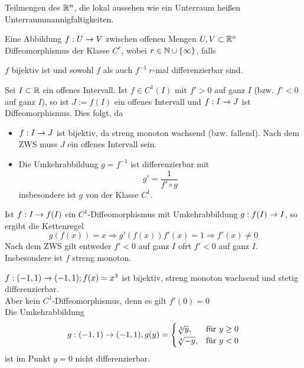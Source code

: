 \documentclass[../ana2u.tex]{subfiles}
\begin{document}
Teilmengen des \( \mathbb{R}^n \), die lokal aussehen wie ein Unterraum 
heißen Unterraummannigfaltigkeiten.
\begin{defi*}[Diffeomorphismus]
    Eine Abbildung \( f:U\rightarrow V \) zwischen 
    offenen Mengen \( U,V \subset \mathbb{R}^n \) Diffeomorphismus 
    der Klasse \( C^r \), wobei \( r \in \mathbb{N} \cup \{\infty\} \), 
    falls
    \begin{center}
        \( f \) bijektiv ist und sowohl \(f\) als auch 
        \( f^{-1}\ r \)-mal differenzierbar sind.
    \end{center}
\end{defi*}
\begin{bsp}
    Sei \(I \subset \mathbb{R}\) ein offenes Intervall. Ist \(f \in C^1(I)\)
    mit \(f' > 0\) auf ganz \(I\) (bzw. \(f' < 0\) auf ganz \(I\)),
    so ist \(J := f(I)\) ein offenes Intervall und \(f:I\rightarrow J\) 
    ist Diffeomorphismus.
    Dies folgt, da 
    \begin{itemize}
        \item \( f:I\rightarrow J \) ist bijektiv, da 
        streng monoton wachsend (bzw. fallend). Nach dem ZWS muss
        \(J\) ein offenes Intervall sein.
        \item Die Umkehrabbildung \(g = f^{-1}\) ist differenzierbar mit
        \[ g' = \frac{1}{f' \circ g} \]
        insbesondere ist \(g\) von der Klasse \(C^1\).
        \end{itemize}
\end{bsp}
\begin{bsp}[Umkehrung]
    Ist \(f:I\rightarrow f(I)\) ein \(C^1\)-Diffeomorphismus
    mit Umkehrabbildung \(g:f(I)\rightarrow I\), so ergibt die Kettenregel
    \[ g(f(x)) = x \Rightarrow g'(f(x))f'(x) = 1 \Rightarrow f'(x) \neq 0 \]     
    Nach dem ZWS gilt entweder \(f' < 0\) auf
    ganz \(I\) ofrt \( f' < 0 \) auf ganz \(I\).
    Insbesondere ist \(f\) streng monoton.
\end{bsp}
\begin{bsp}[Gegenbeispiel]
    \(f:(-1, 1)\rightarrow (-1, 1); f(x) = x^3\) ist bijektiv, 
    streng monoton wachsend und stetig differenzierbar.\\
    Aber kein \(C^1\)-Diffeomorphismus, denn es gilt \(f'(0) = 0\)\\
    Die Umkehrabbildung 
    \[ g:(-1,1)\rightarrow (-1,1), g(y) = \begin{cases}
        \sqrt[3]{y}, &\text{für } y \geq 0 \\
        \sqrt[3]{-y}, &\text{für } y < 0
    \end{cases}\]
    ist im Punkt \(y = 0\) nicht differenzierbar.
\end{bsp}
\end{document}
